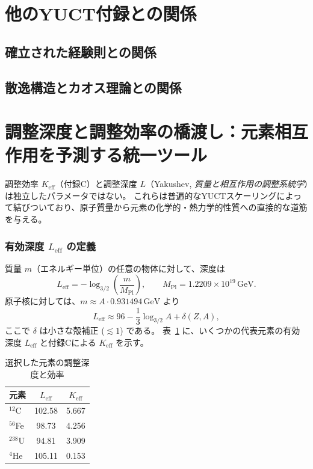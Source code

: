 \documentclass[11pt,a4paper]{article}
\begin{document}
	\endgroup
	
	\section{他のYUCT付録との関係}
	\subsection{確立された経験則との関係}
	\subsection{散逸構造とカオス理論との関係}
	
	\section{調整深度と調整効率の橋渡し：元素相互作用を予測する統一ツール}
	\label{subsec:bridge}
	
	調整効率 \(K_{\mathrm{eff}}\)（付録C）と調整深度 \(L\)（Yakushev, \textit{質量と相互作用の調整系統学}\cite{YKmass}）は独立したパラメータではない。  
	これらは普遍的なYUCTスケーリングによって結びついており、原子質量から元素の化学的・熱力学的性質への直接的な道筋を与える。
	
	\subsubsection{有効深度 \(L_{\mathrm{eff}}\) の定義}
	質量 \(m\)（エネルギー単位）の任意の物体に対して、深度は
	\begin{equation}
		L_{\mathrm{eff}} = -\log_{3/2}\!\left(\frac{m}{M_{\mathrm{Pl}}}\right),
		\qquad M_{\mathrm{Pl}} = 1.2209\times10^{19}\,\text{GeV}.
	\end{equation}
	原子核に対しては、\(m \approx A \cdot 0.931494\,\text{GeV}\) より
	\begin{equation}
		L_{\mathrm{eff}} \approx 96 - \frac{1}{3}\log_{3/2}A + \delta(Z,A),
	\end{equation}
	ここで \(\delta\) は小さな殻補正 (\(\lesssim 1\)) である。  
	表~\ref{tab:L_Keff} に、いくつかの代表元素の有効深度 \(L_{\mathrm{eff}}\) と付録Cによる \(K_{\mathrm{eff}}\) を示す。
	
	\begin{table}[htbp]
		\centering
		\caption{選択した元素の調整深度と効率}
		\label{tab:L_Keff}
		\begin{tabular}{@{}lcc@{}}
			\toprule
			元素 & \(L_{\mathrm{eff}}\) & \(K_{\mathrm{eff}}\) \\
			\midrule
			$^{12}$C & 102.58 & 5.667 \\
			$^{56}$Fe & 98.73 & 4.256 \\
			$^{238}$U & 94.81 & 3.909 \\
			$^{4}$He & 105.11 & 0.153 \\
			\bottomrule
		\end{tabular}
	\end{table}
	
\end{document}
